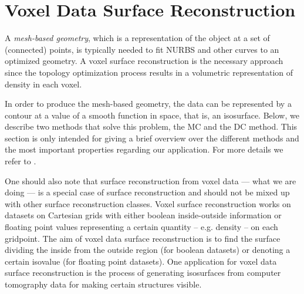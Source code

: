 \section{Voxel Data Surface Reconstruction}
\label{sec:surfaceBackg}
A \emph{mesh-based geometry}, which is a representation of the object at a set of (connected) points, is typically needed to fit \ac{NURBS} and other curves to an optimized geometry. A voxel surface reconstruction is the necessary approach since the topology optimization process results in a volumetric representation of density in each voxel. 

In order to produce the mesh-based geometry, the data can be represented by a contour at a value of a smooth function in space, that is, an isosurface. Below, we describe two methods that solve this problem, the \acl{MC} and the \acl{DC} method. This section is only intended for giving a brief overview over the different methods and the most important properties regarding our application. For more details we refer to \cite{Marching2006, Hermite2002}. 

One should also note that surface reconstruction from voxel data --- what we are doing --- is a special case of surface reconstruction and should not be mixed up with other surface reconstruction classes. Voxel surface reconstruction works on datasets on Cartesian grids with either boolean inside-outside information or floating point values representing a certain quantity -- e.g. density -- on each gridpoint. The aim of voxel data surface reconstruction is to find the surface dividing the inside from the outside region (for boolean datasets) or denoting a certain isovalue (for floating point datasets). One application for voxel data surface reconstruction is the process of generating isosurfaces from computer tomography data for making certain structures visible.



